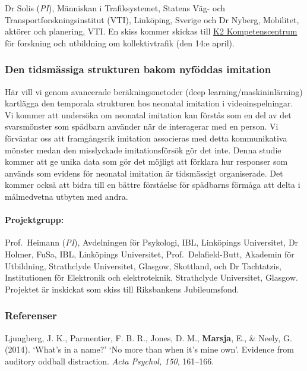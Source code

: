 \documentclass[]{article}
\begin{document}
Dr Solis (\emph{PI}), Människan i Trafiksystemet, Statens Väg- och
Transportforskningsinstitut (VTI), Linköping, Sverige och Dr Nyberg,
Mobilitet, aktörer och planering, VTI. En skiss kommer skickas till
\href{https://www.k2centrum.se/}{K2 Kompetenscentrum} för forskning och
utbildning om kollektivtrafik (den 14:e april).

\hypertarget{den-tidsmuxe4ssiga-strukturen-bakom-nyfuxf6ddas-imitation}{%
\subsubsection{Den tidsmässiga strukturen bakom nyföddas
imitation}\label{den-tidsmuxe4ssiga-strukturen-bakom-nyfuxf6ddas-imitation}}

Här vill vi genom avancerade beräkningsmetoder (deep
learning/maskininlärning) kartlägga den temporala strukturen hos
neonatal imitation i videoinspelningar. Vi kommer att undersöka om
neonatal imitation kan förstås som en del av det svarsmönster som
spädbarn använder när de interagerar med en person. Vi förväntar oss att
framgångsrik imitation associeras med detta kommunikativa mönster medan
den misslyckade imitationsförsök gör det inte. Denna studie kommer att
ge unika data som gör det möjligt att förklara hur responser som används
som evidens för neonatal imitation är tidsmässigt organiserade. Det
kommer också att bidra till en bättre förståelse för spädbarns förmåga
att delta i målmedvetna utbyten med andra.

\hypertarget{projektgrupp-3}{%
\paragraph{Projektgrupp:}\label{projektgrupp-3}}

Prof.~Heimann (\emph{PI}), Avdelningen för Psykologi, IBL, Linköpings
Universitet, Dr Holmer, FuSa, IBL, Linköpings Universitet,
Prof.~Delafield-Butt, Akademin för Utbildning, Strathclyde Universitet,
Glasgow, Skottland, och Dr Tachtatzis, Institutionen för Elektronik och
elektroteknik, Strathclyde Universitet, Glasgow. Projektet är inskickat
som skiss till Riksbankens Jubileumsfond.

\hypertarget{referenser}{%
\subsubsection{Referenser}\label{referenser}}

\small

Ljungberg, J. K., Parmentier, F. B. R., Jones, D. M., \textbf{Marsja},
E., \& Neely, G. (2014). `What's in a name?' `No more than when it's
mine own'. Evidence from auditory oddball distraction. \emph{Acta
Psychol, 150}, 161--166.
\end{document}
